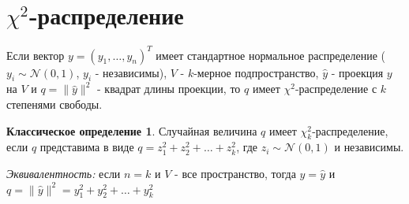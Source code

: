 \documentclass[12pt]{article} %
\theoremstyle{definition} %
\begin{document}
\section{$\chi^2$-распределение}

\begin{define}\label{d1}
    Если вектор $y = (y_1, \hdots, y_n)^T$ имеет стандартное нормальное распределение ( $y_i \sim \mathcal{N}(0, 1)$, $y_i$ - независимы), $V$ - $k$-мерное подпространство, $\hat y$ - проекция $y$ на $V$ и $q = \lVert \hat y \rVert^2$ - квадрат длины проекции, то $q$ имеет $\chi^2$-распределение с $k$ степенями свободы.
\end{define}

\newtheorem*{classic_def}{Классическое определение}
\begin{classic_def}\label{cd1}
    Случайная величина $q$ имеет $\chi_k^2$-распределение, если $q$ представима в виде $q = z_1^2 + z_2^2 + \hdots + z_k^2$, где $z_i \sim \mathcal{N}(0, 1)$ и независимы.
\end{classic_def}
\addlinespace
\emph{Эквивалентность:} если $n=k$ и $V$ - все пространство, тогда $y = \hat y$ и $q = \lVert \hat y \rVert ^2 = y_1^2 + y_2^2 + \hdots + y_k^2$ \par
\addlinespace
\newtheorem*{exerc}{Упражнение}
\end{document}
